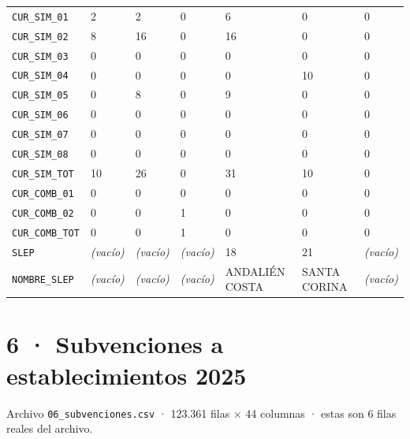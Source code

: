\documentclass[10pt]{article}
\begin{document}
\begin{xltabular}{\linewidth}{@{}p{4.3cm} Y Y Y Y Y Y @{}}
\texttt{CUR\_\allowbreak{}SIM\_\allowbreak{}01} & 2 & 2 & 0 & 6 & 0 & 0 \\
\texttt{CUR\_\allowbreak{}SIM\_\allowbreak{}02} & 8 & 16 & 0 & 16 & 0 & 0 \\
\texttt{CUR\_\allowbreak{}SIM\_\allowbreak{}03} & 0 & 0 & 0 & 0 & 0 & 0 \\
\texttt{CUR\_\allowbreak{}SIM\_\allowbreak{}04} & 0 & 0 & 0 & 0 & 10 & 0 \\
\texttt{CUR\_\allowbreak{}SIM\_\allowbreak{}05} & 0 & 8 & 0 & 9 & 0 & 0 \\
\texttt{CUR\_\allowbreak{}SIM\_\allowbreak{}06} & 0 & 0 & 0 & 0 & 0 & 0 \\
\texttt{CUR\_\allowbreak{}SIM\_\allowbreak{}07} & 0 & 0 & 0 & 0 & 0 & 0 \\
\texttt{CUR\_\allowbreak{}SIM\_\allowbreak{}08} & 0 & 0 & 0 & 0 & 0 & 0 \\
\texttt{CUR\_\allowbreak{}SIM\_\allowbreak{}TOT} & 10 & 26 & 0 & 31 & 10 & 0 \\
\texttt{CUR\_\allowbreak{}COMB\_\allowbreak{}01} & 0 & 0 & 0 & 0 & 0 & 0 \\
\texttt{CUR\_\allowbreak{}COMB\_\allowbreak{}02} & 0 & 0 & 1 & 0 & 0 & 0 \\
\texttt{CUR\_\allowbreak{}COMB\_\allowbreak{}TOT} & 0 & 0 & 1 & 0 & 0 & 0 \\
\texttt{SLEP} & \textit{\color{gris}(vacío)} & \textit{\color{gris}(vacío)} & \textit{\color{gris}(vacío)} & 18 & 21 & \textit{\color{gris}(vacío)} \\
\texttt{NOMBRE\_\allowbreak{}SLEP} & \textit{\color{gris}(vacío)} & \textit{\color{gris}(vacío)} & \textit{\color{gris}(vacío)} & ANDALIÉN COSTA & SANTA CORINA & \textit{\color{gris}(vacío)} \\
\end{xltabular}
\normalsize

\clearpage
\hypertarget{base6}{}
\section{6 · Subvenciones a establecimientos 2025}
\small Archivo \texttt{06\_subvenciones.csv} · 123.361 filas × 44 columnas · estas son 6 filas reales del archivo.\normalsize
\end{document}
